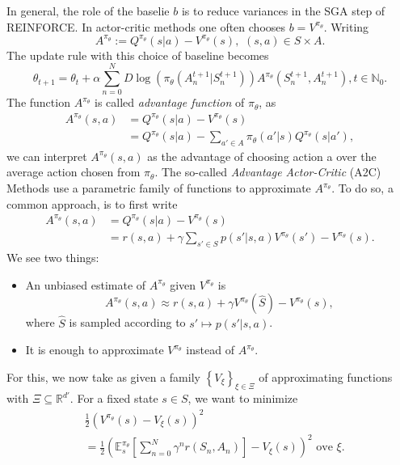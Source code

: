 In general, the role of the baselie \( b \) is to reduce variances in the SGA step of REINFORCE. In actor-critic methods one often chooses \( b = V^{\pi_\theta} \). Writing 
\[
    A^{\pi_\theta} := Q^{\pi_\theta}(s|a) - V^{\pi_\theta}(s), \,\, (s,a) \in S \times A.
\]  
The update rule with this choice of baseline becomes 
\[
     \theta_{t+1} = \theta_t + \alpha \sum_{n=0}^N D \log( \pi_\theta(A_n^{t+1} | S_n^{t+1}) ) A^{\pi_\theta}(S_n^{t+1}, A_n^{t+1}), t \in \mathbb{N}_{0}.
\]
The function 
\( A^{\pi_\theta} \) is called \emph{advantage function} of \( \pi_\theta \), as 
\begin{align*}
    A^{\pi_\theta}(s,a) &= Q^{\pi_\theta}(s|a) - V^{\pi_\theta}(s) \\
                 &= Q^{\pi_\theta}(s|a) - \sum_{a' \in A} \pi_\theta(a' | s) Q^{\pi_\theta}(s|a'),
\end{align*}  
we can interpret \( A^{\pi_\theta}(s,a) \) as the advantage of choosing action a over the average action chosen from \( \pi_\theta \). The so-called \emph{Advantage Actor-Critic} (A2C) Methods use a parametric family of functions to approximate \( A^{\pi_\theta} \).
To do so, a common approach, is to first write 
\begin{align*}
    A^{\pi_\theta}(s,a) & = Q^{\pi_\theta}(s|a) - V^{\pi_\theta}(s)                                        \\
                        & = r(s,a) + \gamma \sum_{s' \in S} p(s' | s,a) V^{\pi_\theta}(s') - V^{\pi_\theta}(s).
\end{align*}
We see two things:
\begin{itemize}
    \item An unbiased estimate of \( A^{\pi_\theta} \) given \( V^{\pi_\theta} \) is 
    \[
         A^{\pi_\theta}(s,a) \approx r(s,a) + \gamma V^{\pi_\theta}(\hat{S}) - V^{\pi_\theta}(s),
    \] where \( \hat{S} \) is sampled according to \( s' \mapsto p(s' | s,a) \).
    \item It is enough to approximate \( V^{\pi_\theta} \) instead of \( A^{\pi_\theta} \).
\end{itemize}
 For this, we now take as given a family \( \left\{ V_\xi \right\}_{ \xi \in \Xi} \) of approximating functions with \( \Xi \subseteq \mathbb{R}^{d'} \). For a fixed state \( s \in S \), we want to minimize
 \begin{align*}
      & \frac{1}{2} (V^{\pi_\theta}(s) - V_{\xi}(s))^2                                                                                 \\
      & = \frac{1}{2} ( \mathbb{E}_s^{\pi_\theta} \left[ \sum_{ n=0}^N \gamma^n r(S_n, A_n) \right] - V_{\xi}(s) )^2 \text{ ove } \xi.
 \end{align*}
